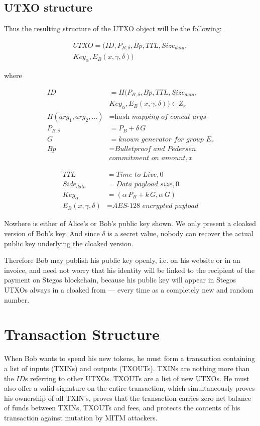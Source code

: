 \documentclass[8pt,fleqn,openany]{book}
\begin{document}
{		\subsection{UTXO structure}
		Thus the resulting structure of the UTXO object will be the following:
		
		\begin{multline*}
		UTXO = (ID, P_{B, \delta}, Bp, TTL, Size_{data},\\
		Key_{\alpha}, E_B(x, \gamma, \delta))
		\end{multline*}
		
		where
		
		\begin{align*}
		ID &= H(P_{B, \delta}, Bp, TTL, Size_{data}, \\ 
		& Key_{\alpha}, E_B(x, \gamma, \delta)) \in Z_r \\
		H(arg_1, arg_2, ...) &= \textit{hash mapping of concat args} \\
		P_{B, \delta} &= P_B + \delta \, G \\
		G &= \textit{known generator for group } E_r \\
		Bp &= \textit{Bulletproof and Pedersen} \\
		& \textit{commitment on amount}, x 
		\end{align*}
		
		\begin{align*}
		TTL &= \textit{Time-to-Live}, 0 \\
		Side_{data} &= \textit{Data payload size}, 0 \\
		Key_{\alpha} &= (\alpha \, P_{B} + k \, G, \alpha \, G ) \\
		E_B(x, \gamma, \delta) &= \textit{AES-128 encrypted payload}
		\end{align*}
		
		Nowhere is either of Alice’s or Bob’s public key shown. We only present a cloaked version of Bob’s key. And since $\delta$ is a secret value, nobody can recover the actual public key underlying the cloaked version. 
		
		Therefore Bob may publish his public key openly, i.e. on his website or in an invoice, and need not worry that his identity will be linked to the recipient of the payment on Stegos blockchain, because his public key will appear in Stegos UTXOs always in a cloaked from — every time as a completely new and random number.
		
		\section{Transaction Structure}
		When Bob wants to spend his new tokens, he must form a transaction containing a list of inputs (TXINs) and outputs (TXOUTs). TXINs are nothing more than the $\mathit{ID}$s referring to other UTXOs. TXOUTs are a list of new UTXOs. He must also offer a valid signature on the entire transaction, which simultaneously proves his ownership of all TXIN’s, proves that the transaction carries zero net balance of funds between TXINs, TXOUTs and fees, and protects the contents of his transaction against mutation by MITM attackers.
		
}
\end{document}
